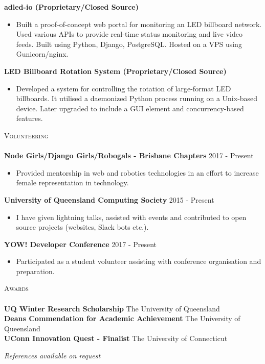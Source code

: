 \documentclass[a4paper]{article}
\newcommand{\lineunder} {
    \vspace*{-8pt} \\
    \hspace*{-10pt} \hrulefill \\
}
\newcommand{\header} [1] {
    {\hspace*{-10pt}\vspace*{6pt} \textsc{#1}}
    \vspace*{-6pt} \lineunder
}
\newenvironment{singleitem}
{   \small
    \vspace{-2.6pt}
    \begin{itemize}
    \setlength{\itemsep}{0pt}
    \setlength{\parskip}{0pt}
    \setlength{\parsep}{0pt}   }
{\end{itemize} \vspace{-2.6pt}	}
\begin{document}
\textbf{adled-io (Proprietary/Closed Source)}
\begin{singleitem}
	\item Built a proof-of-concept web portal for monitoring an LED billboard network. Used various APIs to provide real-time status monitoring and live video feeds. Built using Python, Django, PostgreSQL. Hosted on a VPS using Gunicorn/nginx.
\end{singleitem}

\textbf{LED Billboard Rotation System (Proprietary/Closed Source)}
\begin{singleitem}
	\item Developed a system for controlling the rotation of large-format LED billboards. It utilised a daemonized Python process running on a Unix-based device. Later upgraded to include a GUI element and concurrency-based features.
\end{singleitem}

\vspace{1mm}

\header{Volunteering}
\textbf{Node Girls/Django Girls/Robogals - Brisbane Chapters} \hfill 2017 - Present\\
\begin{singleitem}
	\item Provided mentorship in web and robotics technologies in an effort to increase female representation in technology.
\end{singleitem}
\textbf{University of Queensland Computing Society} \hfill 2015 - Present\\
\begin{singleitem}
	\item I have given lightning talks, assisted with events and contributed to open source projects (websites, Slack bots etc.).
\end{singleitem}
\textbf{YOW! Developer Conference} \hfill 2017 - Present\\
\begin{singleitem}
	\item Participated as a student volunteer assisting with conference organisation and preparation.
\end{singleitem}

\header{Awards}
\textbf{UQ Winter Research Scholarship} \hfill The University of Queensland\\
\textbf{Dean\textquotesingle{}s Commendation for Academic Achievement} \hfill The University of Queensland\\
\textbf{UConn Innovation Quest - Finalist} \hfill The University of Connecticut\\

\vspace{3mm}
\begin{center}
\small \textit{References available on request}
\end{center}
\end{document}
